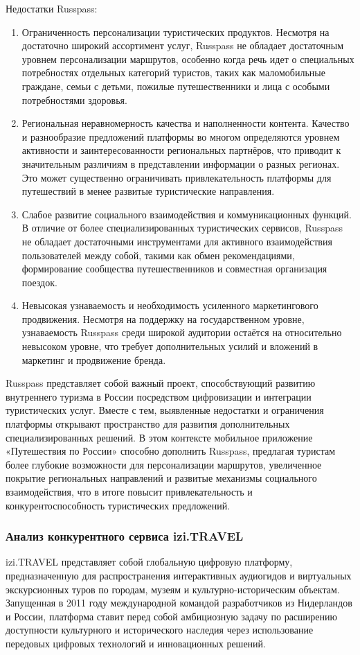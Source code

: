 \noindent Недостатки Russpass:
\begin{enumerate}
    \item Ограниченность персонализации туристических продуктов. Несмотря на достаточно широкий ассортимент услуг, Russpass не обладает достаточным уровнем персонализации маршрутов, особенно когда речь идет о специальных потребностях отдельных категорий туристов, таких как маломобильные граждане, семьи с детьми, пожилые путешественники и лица с особыми потребностями здоровья.
    \item Региональная неравномерность качества и наполненности контента. Качество и разнообразие предложений платформы во многом определяются уровнем активности и заинтересованности региональных партнёров, что приводит к значительным различиям в представлении информации о разных регионах. Это может существенно ограничивать привлекательность платформы для путешествий в менее развитые туристические направления.
    \item Слабое развитие социального взаимодействия и коммуникационных функций. В отличие от более специализированных туристических сервисов, Russpass не обладает достаточными инструментами для активного взаимодействия пользователей между собой, такими как обмен рекомендациями, формирование сообщества путешественников и совместная организация поездок.
    \item Невысокая узнаваемость и необходимость усиленного маркетингового продвижения. Несмотря на поддержку на государственном уровне, узнаваемость Russpass среди широкой аудитории остаётся на относительно невысоком уровне, что требует дополнительных усилий и вложений в маркетинг и продвижение бренда.
\end{enumerate}

\noindent Russpass представляет собой важный проект, способствующий развитию внутреннего туризма в России посредством цифровизации и интеграции туристических услуг. Вместе с тем, выявленные недостатки и ограничения платформы открывают пространство для развития дополнительных специализированных решений. В этом контексте мобильное приложение «Путешествия по России» способно дополнить Russpass, предлагая туристам более глубокие возможности для персонализации маршрутов, увеличенное покрытие региональных направлений и развитые механизмы социального взаимодействия, что в итоге повысит привлекательность и конкурентоспособность туристических предложений.

\subsubsection*{Анализ конкурентного сервиса izi.TRAVEL}
izi.TRAVEL представляет собой глобальную цифровую платформу, предназначенную для распространения интерактивных аудиогидов и виртуальных экскурсионных туров по городам, музеям и культурно-историческим объектам. Запущенная в 2011 году международной командой разработчиков из Нидерландов и России, платформа ставит перед собой амбициозную задачу по расширению доступности культурного и исторического наследия через использование передовых цифровых технологий и инновационных решений.

